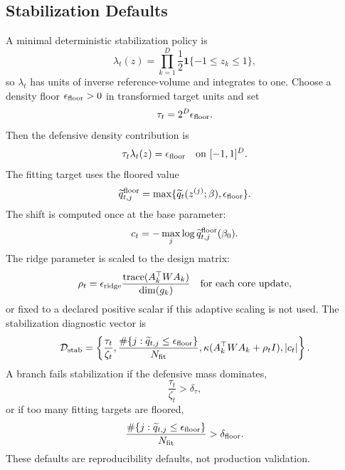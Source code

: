 \documentclass[11pt]{article}
\numberwithin{equation}{section}
\newcommand{\ind}{\mathbf 1}
\begin{document}
\subsection*{Stabilization Defaults}

A minimal deterministic stabilization policy is
\begin{equation}
    \lambda_t(z)=\prod_{k=1}^D\frac12\ind\{-1\le z_k\le1\},
    \label{eq:p24-p23-stab1}
\end{equation}
so \(\lambda_t\) has units of inverse reference-volume and integrates to one.
Choose a density floor \(\epsilon_{\rm floor}>0\) in transformed target units
and set
\begin{equation}
    \tau_t=2^D\epsilon_{\rm floor}.
    \label{eq:p24-p23-stab2}
\end{equation}
Then the defensive density contribution is
\begin{equation}
    \tau_t\lambda_t(z)=\epsilon_{\rm floor}
    \quad\text{on }[-1,1]^D.
    \label{eq:p24-p23-stab3}
\end{equation}
The fitting target uses the floored value
\begin{equation}
    \widetilde q_{t,j}^{\rm floor}
    =
    \max\{\widetilde q_t(z^{(j)};\beta),\epsilon_{\rm floor}\}.
    \label{eq:p24-p23-stab4}
\end{equation}
The shift is computed once at the base parameter:
\begin{equation}
    c_t
    =
    -\max_j\log \widetilde q_{t,j}^{\rm floor}(\beta_0).
    \label{eq:p24-p23-stab5}
\end{equation}
The ridge parameter is scaled to the design matrix:
\begin{equation}
    \rho_t
    =
    \epsilon_{\rm ridge}
    \frac{\operatorname{trace}(A_k^\top W A_k)}
    {\dim(g_k)}
    \quad\text{for each core update,}
    \label{eq:p24-p23-stab6}
\end{equation}
or fixed to a declared positive scalar if this adaptive scaling is not used.
The stabilization diagnostic vector is
\begin{equation}
    \mathcal D_{\rm stab}
    =
    \left\{
    \frac{\tau_t}{\zeta_t},
    \frac{\#\{j:\widetilde q_{t,j}\le\epsilon_{\rm floor}\}}{N_{\rm fit}},
    \kappa(A_k^\top W A_k+\rho_t I),
    |c_t|
    \right\}.
    \label{eq:p24-p23-stab7}
\end{equation}
A branch fails stabilization if the defensive mass dominates,
\begin{equation}
    \frac{\tau_t}{\zeta_t}>\delta_\tau,
    \label{eq:p24-p23-stab8}
\end{equation}
or if too many fitting targets are floored,
\begin{equation}
    \frac{\#\{j:\widetilde q_{t,j}\le\epsilon_{\rm floor}\}}{N_{\rm fit}}
    >
    \delta_{\rm floor}.
    \label{eq:p24-p23-stab9}
\end{equation}
These defaults are reproducibility defaults, not production validation.
\end{document}
